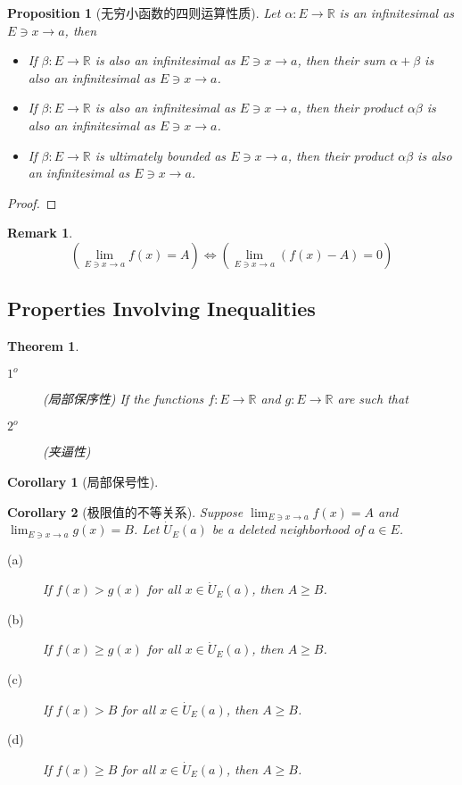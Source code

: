\documentclass[onecolumn]{ctexart}
\newtheorem{theorem}{Theorem}
\newtheorem{proposition}{Proposition}
\newtheorem{corollary}{Corollary}
\newtheorem{remark}{Remark}
\begin{document}
\begin{proposition}[无穷小函数的四则运算性质]
  Let $\alpha: E \to \mathbb{R}$ is an infinitesimal as $E \owns x \to a$, then
  \begin{itemize}
    \item If $\beta: E \to \mathbb{R}$ is also an infinitesimal as $E \owns x 
    \to a$, then their sum $\alpha + \beta$ is also an infinitesimal as $E \owns 
    x \to a$.
    \item If $\beta: E \to \mathbb{R}$ is also an infinitesimal as $E \owns x 
    \to a$, then their product $\alpha \beta$ is also an infinitesimal as $E 
    \owns x \to a$.
    \item If $\beta: E \to \mathbb{R}$ is ultimately bounded as $E \owns x \to a$,
    then their product $\alpha \beta$ is also an infinitesimal as $E \owns x \to 
    a$. 
  \end{itemize}
\end{proposition}
\begin{proof}
  
\end{proof}
\begin{remark}
  \begin{equation}
    (\lim_{E \owns x \to a} f(x) = A) \Leftrightarrow (\lim_{E \owns x \to a} (f(x) - A) = 0)
  \end{equation}
\end{remark}

\subsection{Properties Involving Inequalities}
\begin{theorem}
  \begin{description}
    \item[$1^o$] (局部保序性) If the functions $f: E \to \mathbb{R}$ and $g: E \to \mathbb{R}$ are such that 
    \item[$2^o$] (夹逼性)
  \end{description}
\end{theorem}

\begin{corollary}[局部保号性]
  
\end{corollary}

\begin{corollary}[极限值的不等关系]
  Suppose $\lim_{E \owns x \to a} f(x) = A$ and $\lim_{E \owns x \to a} g(x) = 
  B$. Let $\dot{U}_E(a)$ be a deleted neighborhood of $a \in E$.
  \begin{description}
    \item[(a)] If $f(x) > g(x)$ for all $x \in \dot{U}_E(a)$, then $A \geq B$.
    \item[(b)] If $f(x) \geq g(x)$ for all $x \in \dot{U}_E(a)$, then $A \geq B$.
    \item[(c)] If $f(x) > B$ for all $x \in \dot{U}_E(a)$, then $A \geq B$.
    \item[(d)] If $f(x) \geq B$ for all $x \in \dot{U}_E(a)$, then $A \geq B$.
  \end{description}
\end{corollary}
\end{document}
